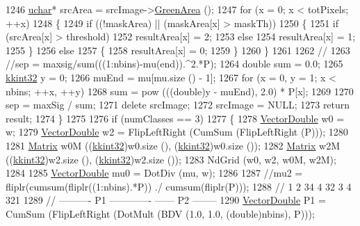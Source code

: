 \begin{DoxyCode}
{{{1246     \hyperlink{namespace_k_k_b_ace9969169bf514f9ee6185186949cdf7}{uchar}*  srcArea    = srcImage->\hyperlink{class_k_k_b_1_1_raster_af6ceacfa7835a295d239d141627dbec7}{GreenArea} ();
1247     \textcolor{keywordflow}{for}  (x = 0;  x < totPixels;  ++x)
1248     \{
1249       \textcolor{keywordflow}{if}  ((!maskArea)  ||  (maskArea[x] > maskTh))
1250       \{
1251         \textcolor{keywordflow}{if}  (srcArea[x] > threshold)
1252           resultArea[x] = 2;
1253         \textcolor{keywordflow}{else}
1254           resultArea[x] = 1;
1255       \}
1256       \textcolor{keywordflow}{else}
1257       \{
1258         resultArea[x] = 0;
1259       \}
1260     \}
1261     
1262     \textcolor{comment}{//%
1263     \textcolor{comment}{//sep = maxsig/sum(((1:nbins)-mu(end)).^2.*P);}
1264     \textcolor{keywordtype}{double}  sum = 0.0;
1265     \hyperlink{namespace_k_k_b_a8fa4952cc84fda1de4bec1fbdd8d5b1b}{kkint32}  y = 0;
1266     muEnd = mu[mu.size () - 1];
1267     \textcolor{keywordflow}{for}  (x = 0, y = 1;  x < nbins;  ++x, ++y)
1268       sum = pow (((\textcolor{keywordtype}{double})y - muEnd), 2.0) * P[x];
1269 
1270     sep = maxSig / sum;
1271     \textcolor{keyword}{delete}  srcImage;
1272     srcImage = NULL;
1273     \textcolor{keywordflow}{return}  result;
1274   \}
1275     
1276   \textcolor{keywordflow}{if}  (numClasses == 3)
1277   \{
1278     \hyperlink{namespace_k_k_b_a5906c207479607e5f450434095914a41}{VectorDouble}  w0 = w;
1279     \hyperlink{namespace_k_k_b_a5906c207479607e5f450434095914a41}{VectorDouble}  w2 = FlipLeftRight (CumSum (FlipLeftRight (P)));
1280 
1281     \hyperlink{class_k_k_b_1_1_matrix}{Matrix} w0M ((\hyperlink{namespace_k_k_b_a8fa4952cc84fda1de4bec1fbdd8d5b1b}{kkint32})w0.size (), (\hyperlink{namespace_k_k_b_a8fa4952cc84fda1de4bec1fbdd8d5b1b}{kkint32})w0.size ());
1282     \hyperlink{class_k_k_b_1_1_matrix}{Matrix} w2M ((\hyperlink{namespace_k_k_b_a8fa4952cc84fda1de4bec1fbdd8d5b1b}{kkint32})w2.size (), (\hyperlink{namespace_k_k_b_a8fa4952cc84fda1de4bec1fbdd8d5b1b}{kkint32})w2.size ());
1283     NdGrid (w0, w2, w0M, w2M);
1284     
1285     \hyperlink{namespace_k_k_b_a5906c207479607e5f450434095914a41}{VectorDouble}  mu0 = DotDiv (mu, w);
1286 
1287     \textcolor{comment}{//mu2 = fliplr(cumsum(fliplr((1:nbins).*P)) ./ cumsum(fliplr(P)));}
1288     \textcolor{comment}{//            1      2      34       4   32        3      4 321}
1289     \textcolor{comment}{//             ---------- P1 -------------     ------ P2 --------}
1290     \hyperlink{namespace_k_k_b_a5906c207479607e5f450434095914a41}{VectorDouble}  P1 = CumSum (FlipLeftRight (DotMult (BDV (1.0, 1.0, (\textcolor{keywordtype}{double})nbins), P)));
}}}}
\end{DoxyCode}

